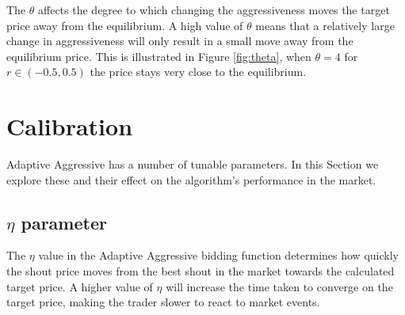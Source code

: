 \documentclass[preprint]{acm_proc_article-sp} %
\begin{document}
The $\theta$ affects the degree to which changing the aggressiveness moves the
target price away from the equilibrium. A high value of $\theta$ means that a
relatively large change in aggressiveness will only result in a small move away from
the equilibrium price. This is illustrated in Figure \ref{fig:theta}, when
$\theta=4$ for $r \in (-0.5, 0.5)$ the price stays very close
to the equilibrium.\\



\section{Calibration} \label{sec:calibration}
Adaptive Aggressive has a number of tunable parameters. In this Section we
explore these and their effect on the algorithm's performance in the market.\\


\subsection{$\eta$ parameter} \label{sec:calibration_eta}
The $\eta$ value in the Adaptive Aggressive bidding function determines how
quickly the shout price moves from the best shout in the market towards the
calculated target price. A higher value of $\eta$ will increase the time taken
to converge on the target price, making the trader slower to react to market
events. 
\end{document}

